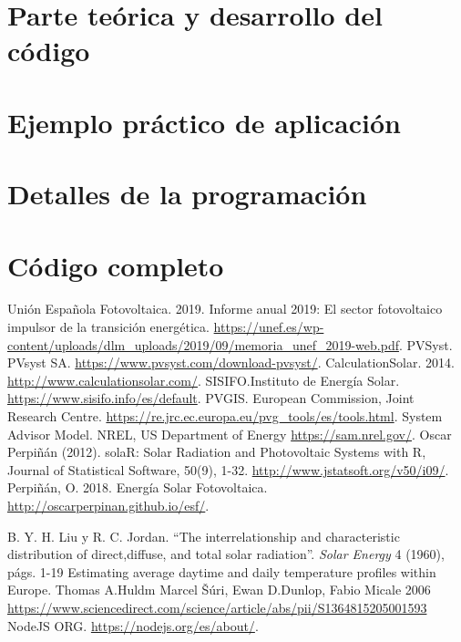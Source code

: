 \documentclass[11pt]{report}
\begin{document}
\chapter{Parte teórica y desarrollo del código}
\label{sec:theory}


\chapter{Ejemplo práctico de aplicación}


\chapter{Detalles de la programación}


\appendix
\chapter{Código completo}


\pagebreak

\begin{thebibliography}{99}

 Unión Española Fotovoltaica. 2019. Informe anual 2019: El sector fotovoltaico impulsor de la transición energética. \url{https://unef.es/wp-content/uploads/dlm_uploads/2019/09/memoria_unef_2019-web.pdf}.  
 PVSyst. PVsyst SA.  \url{https://www.pvsyst.com/download-pvsyst/}.  
 CalculationSolar. 2014. \url{http://www.calculationsolar.com/}.
 SISIFO.Instituto de Energía Solar.  \url{https://www.sisifo.info/es/default}.  
 PVGIS. European Commission, Joint Research Centre. \url{https://re.jrc.ec.europa.eu/pvg_tools/es/tools.html}.  
 System Advisor Model. NREL, US Department of Energy \url{https://sam.nrel.gov/}.
   Oscar Perpiñán (2012). solaR: Solar Radiation and Photovoltaic
  Systems with R, Journal of Statistical Software, 50(9), 1-32. \url{http://www.jstatsoft.org/v50/i09/}.  
 Perpiñán, O. 2018. Energía Solar Fotovoltaica. \url{http://oscarperpinan.github.io/esf/}.

B. Y. H. Liu y R. C. Jordan. “The interrelationship and characteristic distribution of direct,diffuse, and total solar radiation”. \textit{Solar Energy} 4 (1960), págs. 1-19
 Estimating average daytime and daily temperature profiles within Europe.  Thomas A.Huldm Marcel Šúri, Ewan D.Dunlop, Fabio Micale 2006  \url{https://www.sciencedirect.com/science/article/abs/pii/S1364815205001593}
 NodeJS ORG.  \url{https://nodejs.org/es/about/}.  

\end{thebibliography}
\end{document}
